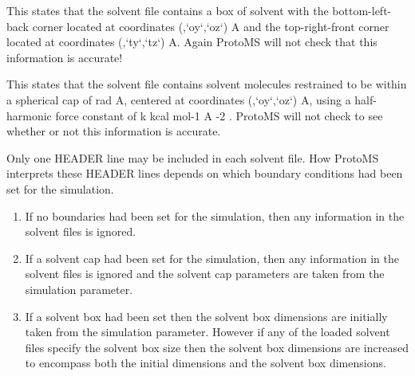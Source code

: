 \documentclass[letterpaper,10pt,english]{sphinxmanual}
\begin{document}
%
\begin{sphinxVerbatim}[commandchars=\\\{\}]
       
\end{sphinxVerbatim}

This states that the solvent file contains a box of solvent with the bottom-left-back corner located at coordinates (,{}`oy{}`,{}`oz{}`) A and the top-right-front corner located at coordinates (,{}`ty{}`,{}`tz{}`) A. Again ProtoMS will not check that this information is accurate!

%
\begin{sphinxVerbatim}[commandchars=\\\{\}]
      
\end{sphinxVerbatim}

This states that the solvent file contains solvent molecules restrained to be within a spherical cap of  rad A, centered at coordinates (,{}`oy{}`,{}`oz{}`) A, using a half-harmonic force constant of k kcal mol-1 A -2 . ProtoMS will not check to see whether or not this information is accurate.

Only one HEADER line may be included in each solvent file. How ProtoMS interprets these HEADER lines depends on which boundary conditions had been set for the simulation.
\begin{enumerate}
\item {} 
If no boundaries had been set for the simulation, then any information in the solvent files is ignored.

\item {} 
If a solvent cap had been set for the simulation, then any information in the solvent files is ignored and the solvent cap parameters are taken from the simulation parameter.

\item {} 
If a solvent box had been set then the solvent box dimensions are initially taken from the simulation parameter. However if any of the loaded solvent files specify the solvent box size then the solvent box dimensions are increased to encompass both the initial dimensions and the solvent box dimensions.

\end{enumerate}
\end{document}
